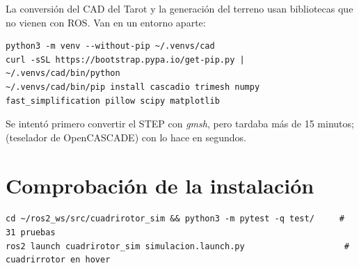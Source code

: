 La conversión del CAD del Tarot y la generación del terreno usan bibliotecas que no vienen con
ROS. Van en un entorno aparte:
\begin{lstlisting}[style=bash]
python3 -m venv --without-pip ~/.venvs/cad
curl -sSL https://bootstrap.pypa.io/get-pip.py | ~/.venvs/cad/bin/python
~/.venvs/cad/bin/pip install cascadio trimesh numpy fast_simplification pillow scipy matplotlib
\end{lstlisting}

\begin{nota}
Se intentó primero convertir el STEP con \emph{gmsh}, pero tardaba más de 15 minutos;
 (teselador de OpenCASCADE) con  lo hace en segundos.
\end{nota}

\section{Comprobación de la instalación}

\begin{lstlisting}[style=bash]
cd ~/ros2_ws/src/cuadrirotor_sim && python3 -m pytest -q test/     # 31 pruebas
ros2 launch cuadrirotor_sim simulacion.launch.py                    # cuadrirrotor en hover
\end{lstlisting}
